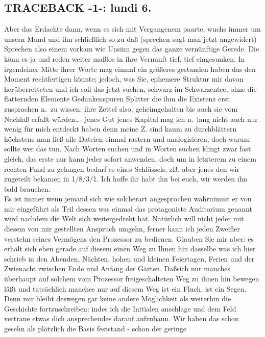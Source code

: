 \documentclass[
]{article}
\author{}
\date{\vspace{-2.5em}}
\begin{document}
\subsection{TRACEBACK -1-: lundi 6.}\label{traceback--1--lundi-6.}

Aber das Erdachte dann, wenn es sich mit Vergangenem paarte, wuchs immer
um unsern Mund und ihn schließlich so zu daß (sprechen sagt man jetzt
angewidert) Sprechen also einem vorkam wie Unsinn gegen das ganze
vernünftige Gerede. Die könn es ja und reden weiter maßlos in ihre
Vernunft tief, tief eingesunken. In irgendeiner Mitte ihrer Worte mag
einmal ein größeres gestanden haben das den Moment rechtfertigen könnte;
jedoch, was Sie, ephemere Struktur mir davon herüberretteten und ich
soll das jetzt suchen, schwarz im Schwarzentee, ohne die flatternden
Elemente Gedankenspuren Splitter die ihm die Existenz erst zusprachen
n.~zu wissen: ihre Zettel also, geheimgehalten bis auch sie vom Nachlaß
erfaßt würden\ldots- jenes Gut jenes Kapital mag ich n.~lang nicht auch
nur wenig für mich entdeckt haben denn meine Z. sind kaum zu
durchblättern höchstens man ließ alle Dateien einmal rastern und
analogisieren; doch warum sollte wer das tun. Nach Worten suchen und in
Worten suchen klingt zwar fast gleich, das erste nur kann jeder sofort
anwenden, doch um in letzterem zu einem rechten Fund zu gelangen bedarf
es eines Schlüssels, zB. aber jenes den wir zugeteilt bekamen in
1/8/3/1. Ich hoffe ihr habt ihn bei euch, wir werden ihn bald
brauchen.\\
Es ist immer wenn jemand sich wie solcherart angesprochen wahrnimmt er
von mir eingeführt als Teil dessen was einmal das protagoniste
Auditorium genannt wird nachdem die Welt sich weitergedreht hat.
Natürlich will nicht jeder mit diesem von mir gestellten Anspruch
umgehn, ferner kann ich jeden Zweifler verstehn seines Vermögens den
Prozessor zu bedienen. Glauben Sie mir aber: es erhält sich eben gerade
auf diesem einen Weg zu Ihnen hin dasselbe was ich hier schrieb in den
Abenden, Nächten, hohen und kleinen Feiertagen, Ferien und der Zwienacht
zwischen Ende und Anfang der Gärten. Daßsich nur manches überhaupt auf
solchem vom Prozessor freigeschalteten Weg zu ihnen hin bewegen läßt und
tatsächlich manches nur auf diesem Weg ist ein Fluch, ist ein Segen.
Denn mir bleibt deswegen gar keine andere Möglichkeit als weiterhin die
Geschichte fortzuschreiben: indes ich die Initialen anschlage und dem
Feld vertraue etwas dich ansprechendes darauf aufzubaun. Wir haben das
schon gesehn als plötzlich die Basis feststand - schon der geringe
\end{document}
